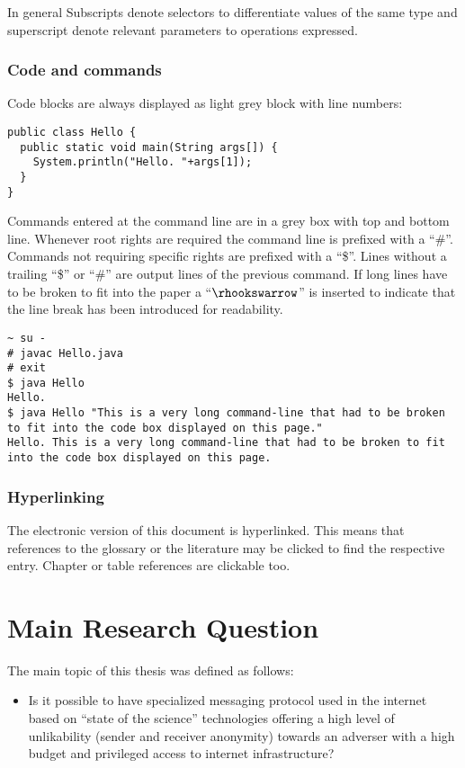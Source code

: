 In general Subscripts denote selectors to differentiate values of the same type and superscript denote relevant parameters to operations expressed.

\subsection{Code and commands}
Code blocks are always displayed as light grey block with line numbers:

\begin{lstlisting}
public class Hello {
  public static void main(String args[]) {
    System.println("Hello. "+args[1]);
  }
}
\end{lstlisting}

Commands entered at the command line are in a grey box with top and bottom line. Whenever root rights are required the command line is prefixed with a ``\#''. Commands not requiring specific rights are prefixed with a ``\$''. Lines without a trailing ``\$'' or ``\#'' are output lines of the previous command. If long lines have to be broken to fit into the paper a ``$\rhookswarrow$'' is inserted to indicate that the line break has been introduced for readability.

\begin{lstlisting}[style=BashInputStyle]
~ su -
# javac Hello.java 
# exit
$ java Hello
Hello.
$ java Hello "This is a very long command-line that had to be broken to fit into the code box displayed on this page."
Hello. This is a very long command-line that had to be broken to fit into the code box displayed on this page.
\end{lstlisting}

\subsection{Hyperlinking}
The electronic version of this  document is hyperlinked. This means that references to the glossary or the literature may be clicked to find the respective entry. Chapter or table references are clickable too. 

\chapter{Main Research Question}
The main topic of this thesis was defined as follows:
\begin{itemize}
	\item Is it possible to have specialized messaging protocol used in the internet based on ``state of the science'' technologies offering a high level of unlikability (sender and receiver anonymity) towards an adverser with a high budget and privileged access to internet infrastructure?
\end{itemize}

